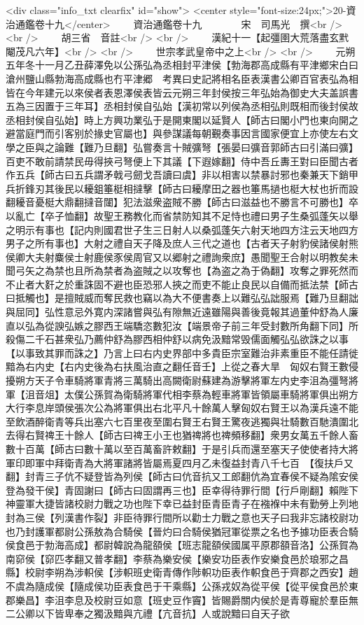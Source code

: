 <div class="info_txt clearfix" id="show">
<center style="font-size:24px;">20-資治通鑑卷十九</center>
  　　資治通鑑卷十九　　　　宋　司馬光　撰<br />
<br />
　　胡三省　音註<br />
<br />
　　漢紀十一【起彊圉大荒落盡玄黓閹茂凡六年】<br />
<br />
　　世宗孝武皇帝中之上<br />
<br />
　　元朔五年冬十一月乙丑薛澤免以公孫弘為丞相封平津侯【勃海郡高成縣有平津鄉宋白曰滄州鹽山縣勃海高成縣也冇平津郷　考異曰史記將相名臣表漢書公卿百官表弘為相皆在今年建元以來侯者表恩澤侯表皆云元朔三年封侯按三年弘始為御史大夫盖誤書五為三因置于三年耳】丞相封侯自弘始【漢初常以列侯為丞相弘則既相而後封侯故丞相封侯自弘始】時上方興功業弘于是開東閣以延賢人【師古曰閣小門也東向開之避當庭門而引客别於掾史官屬也】與參謀議每朝覲奏事因言國家便宜上亦使左右文學之臣與之論難【難乃旦翻】弘嘗奏言十賊彍弩【張晏曰彍音郭師古曰引滿曰彍】百吏不敢前請禁民毋得挾弓弩便上下其議【下遐嫁翻】侍中吾丘夀王對曰臣聞古者作五兵【師古曰五兵謂矛戟弓劒戈吾讀曰虞】非以相害以禁暴討邪也秦兼天下銷甲兵折鋒刃其後民以耰鉏箠梃相撻擊【師古曰耰摩田之器也箠馬撾也梃大杖也折而設翻耰音憂梃大鼎翻撻音闥】犯法滋衆盗賊不勝【師古曰滋益也不勝言不可勝也】卒以亂亡【卒子恤翻】故聖王務教化而省禁防知其不足恃也禮曰男子生桑弧蓬矢以舉之明示有事也【記内則國君世子生三日射人以桑弧蓬矢六射天地四方注云天地四方男子之所有事也】大射之禮自天子降及庶人三代之道也【古者天子射豹侯諸侯射熊侯卿大夫射麋侯士射鹿侯豕侯周官又以郷射之禮詢衆庶】愚聞聖王合射以明教矣未聞弓矢之為禁也且所為禁者為盗賊之以攻奪也【為盗之為于偽翻】攻奪之罪死然而不止者大姧之於重誅固不避也臣恐邪人挾之而吏不能止良民以自備而抵法禁【師古曰抵觸也】是擅賊威而奪民救也竊以為大不便書奏上以難弘弘詘服焉【難乃旦翻詘與屈同】弘性意忌外寛内深諸嘗與弘有隙無近遠雖陽與善後竟報其過董仲舒為人廉直以弘為從諛弘嫉之膠西王端驕恣數犯汝【端景帝子前三年受封數所角翻下同】所殺傷二千石甚衆弘乃薦仲舒為膠西相仲舒以病免汲黯常毁儒面觸弘弘欲誅之以事【以事致其罪而誅之】乃言上曰右内史界部中多貴臣宗室難治非素重臣不能任請徙黯為右内史【右内史後為右扶風治直之翻任音壬】上從之春大旱　匈奴右賢王數侵擾朔方天子令車騎將軍青將三萬騎出高闕衛尉蘇建為游擊將軍左内史李沮為彊弩將軍【沮音俎】太僕公孫賀為衛騎將軍代相李蔡為輕車將軍皆領屬車騎將軍俱出朔方大行李息岸頭侯張次公為將軍俱出右北平凡十餘萬人擊匈奴右賢王以為漢兵遠不能至飲酒醉衛青等兵出塞六七百里夜至圍右賢王右賢王驚夜逃獨與壮騎數百馳潰圍北去得右賢禆王十餘人【師古曰禆王小王也猶禆將也禆頻移翻】衆男女萬五千餘人畜數十百萬【師古曰數十萬以至百萬畜許敕翻】于是引兵而還至塞天子使使者持大將軍印即軍中拜衛青為大將軍諸將皆屬焉夏四月乙未復益封青八千七百　【復扶戶又翻】封青三子伉不疑登皆為列侯【師古曰伉音抗又工郎翻伉為宜春侯不疑為隂安侯登為發干侯】青固謝曰【師古曰固謂再三也】臣幸得待罪行間【行戶剛翻】賴陛下神靈軍大捷皆諸校尉力戰之功也陛下幸已益封臣青臣青子在襁褓中未有勤勞上列地封為三侯【列漢書作裂】非臣待罪行間所以勸士力戰之意也天子曰我非忘諸校尉功也乃封護軍都尉公孫敖為合騎侯【晉灼曰合騎侯猶冠軍從票之名也予據功臣表合騎侯食邑于勃海高成】都尉韓說為龍頟侯【班志龍頟侯國属平原郡頟音洛】公孫賀為南窌侯【窌匹孝翻又普孝翻】李蔡為樂安侯【樂安功臣表作安樂食邑於琅邪之昌縣】校尉李朔為涉軹侯【涉軹班史衛青傳作陟軹功臣表作軹食邑于齊郡之西安】趙不虞為隨成侯【隨成侯功臣表食邑于干乘縣】公孫戎奴為從平侯【從平侯食邑於東郡樂昌】李沮李息及校尉豆如意【班史豆作竇】皆賜爵關内侯於是青尊寵於羣臣無二公卿以下皆卑奉之獨汲黯與亢禮【亢音抗】人或說黯曰自天子欲